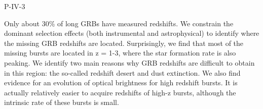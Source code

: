 P-IV-3


\bigskip



\bigskip

\noindent Only about 30\% of long GRBs have measured redshifts. We constrain the dominant selection effects (both instrumental and astrophysical) to identify where the missing GRB redshifts are located. Surprisingly, we find that most of the missing bursts are located in z = 1-3, where the star formation rate is also peaking. We identify two main reasons why GRB redshifts are difficult to obtain in this region: the so-called redshift desert and dust extinction. We also find evidence for an evolution of optical brightness for high redshift bursts. It is actually relatively easier to acquire redshifts of high-z bursts, although the intrinsic rate of these bursts is small.

